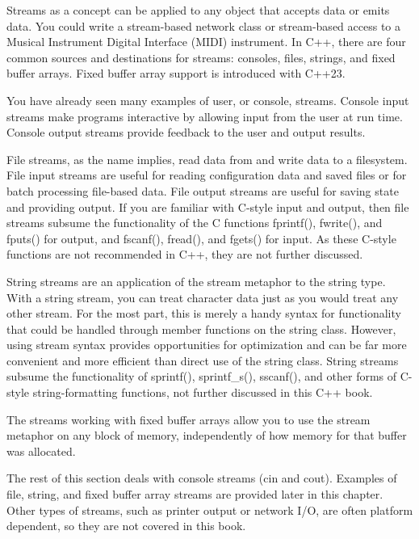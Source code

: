 
Streams as a concept can be applied to any object that accepts data or emits data. You could write a stream-based network class or stream-based access to a Musical Instrument Digital Interface (MIDI) instrument. In C++, there are four common sources and destinations for streams: consoles, files, strings, and fixed buffer arrays. Fixed buffer array support is introduced with C++23.

You have already seen many examples of user, or console, streams. Console input streams make programs interactive by allowing input from the user at run time. Console output streams provide feedback to the user and output results.

File streams, as the name implies, read data from and write data to a filesystem. File input streams are useful for reading configuration data and saved files or for batch processing file-based data. File output streams are useful for saving state and providing output. If you are familiar with C-style input and output, then file streams subsume the functionality of the C functions fprintf(), fwrite(), and fputs() for output, and fscanf(), fread(), and fgets() for input. As these C-style functions are not recommended in C++, they are not further discussed.

String streams are an application of the stream metaphor to the string type. With a string stream, you can treat character data just as you would treat any other stream. For the most part, this is merely a handy syntax for functionality that could be handled through member functions on the string class. However, using stream syntax provides opportunities for optimization and can be far more convenient and more efficient than direct use of the string class. String streams subsume the functionality of sprintf(), sprintf\_s(), sscanf(), and other forms of C-style string-formatting functions, not further discussed in this C++ book.

The streams working with fixed buffer arrays allow you to use the stream metaphor on any block of memory, independently of how memory for that buffer was allocated.

The rest of this section deals with console streams (cin and cout). Examples of file, string, and fixed buffer array streams are provided later in this chapter. Other types of streams, such as printer output or network I/O, are often platform dependent, so they are not covered in this book.

